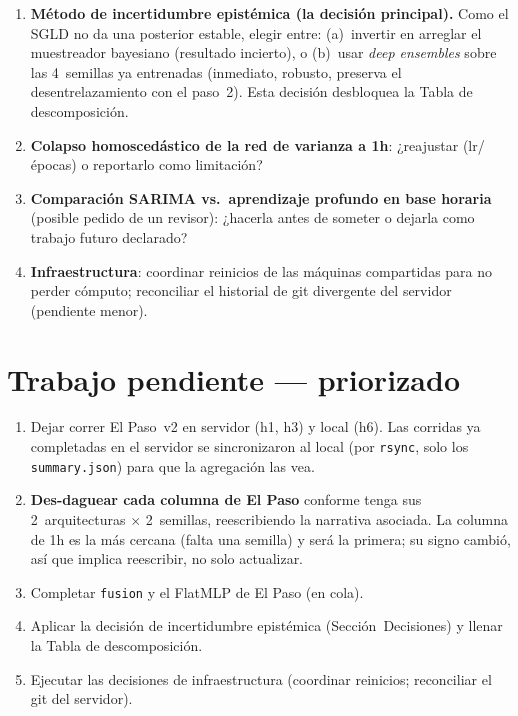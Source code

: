 \documentclass[12pt,a4paper]{article}
\begin{document}
\begin{enumerate}[leftmargin=1.6em, noitemsep]
  \item \textbf{Método de incertidumbre epistémica (la decisión principal).}
        Como el SGLD no da una posterior estable, elegir entre: (a)~invertir
        en arreglar el muestreador bayesiano (resultado incierto), o
        (b)~usar \emph{deep ensembles} sobre las 4~semillas ya entrenadas
        (inmediato, robusto, preserva el desentrelazamiento con el paso~2).
        Esta decisión desbloquea la Tabla de descomposición.
  \item \textbf{Colapso homoscedástico de la red de varianza a 1h}: ¿reajustar
        (lr/épocas) o reportarlo como limitación?
  \item \textbf{Comparación SARIMA vs.\ aprendizaje profundo en base horaria}
        (posible pedido de un revisor): ¿hacerla antes de someter o dejarla
        como trabajo futuro declarado?
  \item \textbf{Infraestructura}: coordinar reinicios de las máquinas
        compartidas para no perder cómputo; reconciliar el historial de git
        divergente del servidor (pendiente menor).
\end{enumerate}

\section{Trabajo pendiente --- priorizado}

\begin{enumerate}[leftmargin=1.5em, noitemsep]
  \item Dejar correr El Paso~v2 en servidor (h1, h3) y local (h6). Las
        corridas ya completadas en el servidor se sincronizaron al local
        (por \texttt{rsync}, solo los \texttt{summary.json}) para que la
        agregación las vea.
  \item \textbf{Des-daguear cada columna de El Paso} conforme tenga sus
        2~arquitecturas $\times$ 2~semillas, reescribiendo la narrativa
        asociada. La columna de 1h es la más cercana (falta una semilla) y
        será la primera; su signo cambió, así que implica reescribir, no solo
        actualizar.
  \item Completar \texttt{fusion} y el FlatMLP de El Paso (en cola).
  \item Aplicar la decisión de incertidumbre epistémica (Sección~Decisiones)
        y llenar la Tabla de descomposición.
  \item Ejecutar las decisiones de infraestructura (coordinar reinicios;
        reconciliar el git del servidor).
\end{enumerate}
\end{document}
